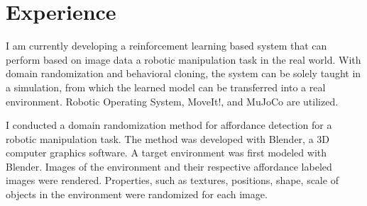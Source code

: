 \documentclass[]{deedy-resume}
\begin{document}
\begin{minipage}[t]{0.66\textwidth} 


\section{Experience}
I am currently developing a reinforcement learning based system that can perform based on image data a robotic manipulation task in the real world. With domain randomization and behavioral cloning, the system can be solely taught in a simulation, from which the learned model can be transferred into a real environment. Robotic Operating System, MoveIt!, and MuJoCo are utilized.      
\sectionsep

I conducted a domain randomization method for affordance detection for a robotic manipulation task. The method was developed with Blender, a 3D computer graphics software. A target environment was first modeled with Blender. Images of the environment and their respective affordance labeled images were rendered. Properties, such as textures, positions, shape, scale of objects in the environment were randomized for each image.   

\sectionsep


\end{minipage}
\end{document}
